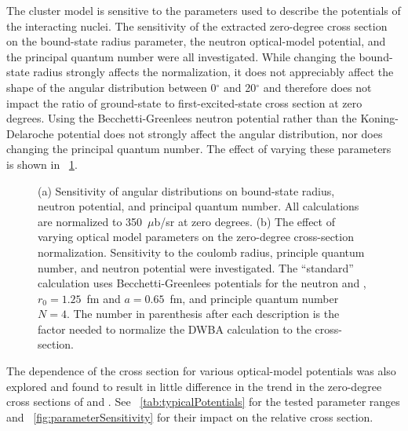 The cluster model is sensitive to the parameters used to describe the potentials of the interacting nuclei.  The sensitivity of the extracted zero-degree cross section on the bound-state radius parameter, the neutron optical-model potential, and the principal quantum number were all investigated.  While changing the bound-state radius strongly affects the normalization, it does not appreciably affect the shape of the angular distribution between 0$^{\circ}$ and 20$^{\circ}$ and therefore does not impact the ratio of ground-state to first-excited-state cross section at zero degrees.  Using the Becchetti-Greenlees neutron potential rather than the Koning-Delaroche potential does not strongly affect the angular distribution, nor does changing the principal quantum number.  The effect of varying these parameters is shown in {\fig}~\ref{fig:varyParam}.
\begin{figure}[!htbp]
\centering
{}
\caption{(a) Sensitivity of angular distributions on bound-state radius, neutron potential, and principal quantum number.  All calculations are normalized to 350~$\mu$b/sr at zero degrees. (b) The effect of varying optical model parameters on the zero-degree cross-section normalization.  Sensitivity to the coulomb radius, principle quantum number, and neutron potential were investigated.  The ``standard'' calculation uses Becchetti-Greenlees potentials for the neutron and , $r_0=1.25$~fm and $a=0.65$~fm, and principle quantum number $N=4$.  The number in parenthesis after each description is the factor needed to normalize the DWBA calculation to the  cross-section.}
\label{fig:varyParam}
\end{figure}
 The dependence of the cross section for various  optical-model potentials was also explored and found to result in little difference in the trend in the zero-degree cross sections of  and .  See {\tab}~\ref{tab:typicalPotentials} for the tested parameter ranges and {\fig}~\ref{fig:parameterSensitivity} for their impact on the relative cross section.

